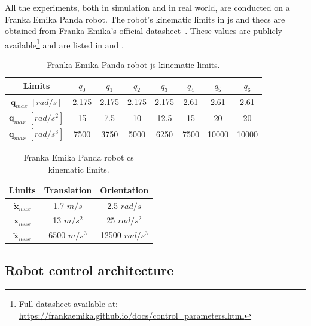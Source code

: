All the experiments, both in simulation and in real world, are conducted on a Franka Emika Panda robot. The robot's kinematic limits in \gls{js} and the\gls{cs} are obtained from Franka Emika's official datasheet~\cite{frankadata}.  These values are publicly available\footnote{\label{note:topca_franka}Full datasheet available at: \url{https://frankaemika.github.io/docs/control_parameters.html}} and are listed in  and .

\begin{table}[h!]
    \centering
    \begin{tabular}{|c|ccccccc|}
        \hline
        Limits & $q_0$ & $q_1$ & $q_2$ & $q_3$ & $q_4$ & $q_5$ & $q_6$ \\
        \hline
        $\dot{\bm{q}}_{max}$ $[{rad}/{s}]$ & 2.175 & 2.175 & 2.175 & 2.175 & 2.61 & 2.61 & 2.61 \\
        $\ddot{\bm{q}}_{max}$ $[{rad}/{s}^2]$ & 15 & 7.5 & 10 & 12.5 & 15 & 20 & 20 \\
        $\dddot{\bm{q}}_{max}$ $[{rad}/{s}^3]$ & 7500 & 3750 & 5000 & 6250 & 7500 & 10000 & 10000 \\
        \hline
    \end{tabular}
    \caption{Franka Emika Panda robot \gls{js} kinematic limits.}
    \label{tab:panda_limits_js}
\end{table}

	
\begin{table}[h]
    \centering
    \begin{tabular}{|c|cc|}
        \hline
        Limits & Translation & Orientation \\
        \hline
        $\dot{\bm{x}}_{max}$ & 1.7 $m/s$ & 2.5 $rad/s$ \\
        $\ddot{\bm{x}}_{max}$ & 13 $m/s^2$ & 25 $rad/s^{2}$\\
        $\dddot{\bm{x}}_{max}$ & 6500 $m/s^3$ & 12500 $rad/s^{3}$\\
        \hline
    \end{tabular}
    \caption{Franka Emika Panda robot \gls{cs} kinematic limits.}
    \label{tab:franka_limits}
\end{table}


\subsection{Robot control architecture}
\label{ch:qp}

